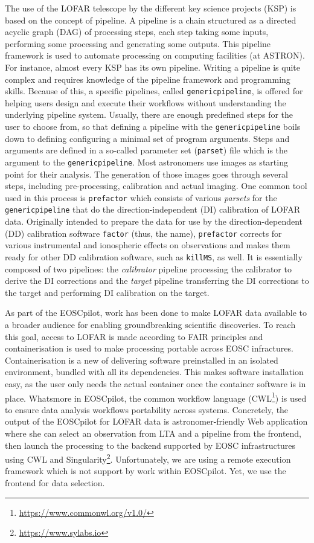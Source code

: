 \documentclass[conference]{IEEEtran}
\newcommand{\tit}[1]{\textit{#1}}
\newcommand{\thi}[1]{\texttt{#1}}
\begin{document}
The use of the LOFAR telescope by the different key science projects (KSP) is based on the concept of pipeline. A pipeline is a chain structured as a directed acyclic graph (DAG) of processing steps, each step taking some inputs, performing some processing and generating some outputs. This pipeline framework is used to automate processing on computing facilities (at ASTRON). For instance, almost every KSP has its own pipeline.
Writing a pipeline is quite complex and requires knowledge of the pipeline framework and programming skills. Because of this, a specific pipelines, called \thi{genericpipeline}, is offered for helping users design and execute their workflows without understanding the underlying pipeline system. Usually, there are enough predefined steps for the user to choose from, so that defining a pipeline with the \thi{genericpipeline} boils down to defining configuring a minimal set of program arguments. Steps and arguments are defined in a so-called parameter set (\thi{parset}) file which is the argument to the \thi{genericpipeline}.
Most astronomers use images as starting point for their analysis. The generation of those images goes through several steps, including pre-processing, calibration and actual imaging. One common tool used in this process is \thi{prefactor} which consists of various \tit{parsets} for the \thi{genericpipeline} that do the direction-independent (DI) calibration of LOFAR data. Originally intended to prepare the data for use by the direction-dependent (DD) calibration software \thi{factor} (thus, the name), \thi{prefactor} corrects for various instrumental and ionospheric effects on observations and makes them ready for other DD calibration software, such as \thi{killMS}, as well. It is essentially composed of two pipelines: the \tit{calibrator} pipeline processing the calibrator to derive the DI corrections and the \tit{target} pipeline transferring the DI corrections to the target and performing DI calibration on the target.

As part of the EOSCpilot, work has been done to make LOFAR data available to a broader audience for enabling groundbreaking scientific discoveries. To reach this goal, access to LOFAR is made according to FAIR principles and containerisation is used to make processing portable across EOSC infractures. Containerisation is a new of delivering software preinstalled in an isolated environment, bundled with all its dependencies. This makes software installation easy, as the user only needs the actual container once the container software is in place. Whatsmore in EOSCpilot, the common workflow language (CWL\footnote{\url{https://www.commonwl.org/v1.0/}}) is used to ensure data analysis workflows portability across systems. Concretely, the output of the EOSCpilot for LOFAR data is astronomer-friendly Web application where she can select an observation from LTA and a pipeline from the frontend, then launch the processing to the backend supported by EOSC infrastructures using CWL and Singularity\footnote{\url{https://www.sylabs.io}}. Unfortunately, we are using a remote execution framework which is not support by work within EOSCpilot. Yet, we use the frontend for data selection.
\end{document}
